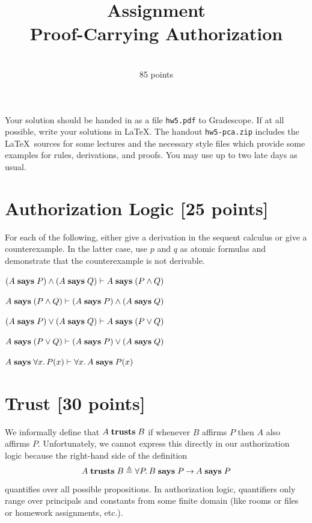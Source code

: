 \documentclass[11pt]{article}
\title{Assignment \lecnum \\ Proof-Carrying Authorization}
\date{\lecdate \\ 85 points}
\begin{document}
\maketitle

Your solution should be handed in as a file \texttt{hw5.pdf} to Gradescope.  If
at all possible, write your solutions in \LaTeX.  The handout
\texttt{hw5-pca.zip} includes the \LaTeX\ sources for some lectures and the
necessary style files which provide some examples for rules, derivations, and
proofs.  You may use up to two late days as usual.

\section{Authorization Logic [25 points]}

For each of the following, either give a derivation in the sequent calculus or
give a counterexample.  In the latter case, use $p$ and $q$ as atomic formulas
and demonstrate that the counterexample is not derivable.

\begin{task}[5 pts]
 $(A \mathrel{\mathbf{says}} P) \land (A \mathrel{\mathbf{says}} Q) \vdash A \mathrel{\mathbf{says}} (P \land Q)$
\end{task}

\begin{task}[5 pts]
 $A \mathrel{\mathbf{says}} (P \land Q) \vdash (A \mathrel{\mathbf{says}} P) \land (A \mathrel{\mathbf{says}} Q)$
\end{task}

\begin{task}[5 pts]
 $(A \mathrel{\mathbf{says}} P) \lor (A \mathrel{\mathbf{says}} Q) \vdash A \mathrel{\mathbf{says}} (P \lor Q)$
\end{task}

\begin{task}[5 pts]
 $A \mathrel{\mathbf{says}} (P \lor Q) \vdash (A \mathrel{\mathbf{says}} P) \lor (A \mathrel{\mathbf{says}} Q)$
\end{task}

\begin{task}[5 pts]
 $A \mathrel{\mathbf{says}} \forall x.\, P(x) \vdash \forall x.\, A \mathrel{\mathbf{says}} P(x)$
\end{task}

\section{Trust [30 points]}
\newcommand{\trusts}{\mathrel{\mb{trusts}}}

We informally define that $A \trusts B$ if whenever $B$ affirms $P$ then $A$
also affirms $P$.  Unfortunately, we cannot express this directly in our
authorization logic because the right-hand side of the definition
\[
  A \trusts B \triangleq \forall P.\, B \says P \arrow A \says P
\]
quantifies over all possible propositions.  In authorization logic, quantifiers
only range over principals and constants from some finite domain (like rooms or
files or homework assignments, etc.).
\end{document}
